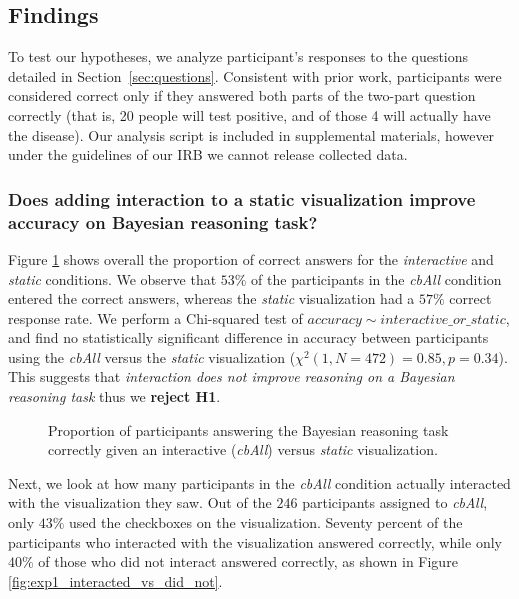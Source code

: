 \subsection{Findings}
To test our hypotheses, we analyze participant's responses to the questions detailed in Section~\ref{sec:questions}. Consistent with prior work\cite{ottley2016Bayesian, ottley2019Curious}, participants were considered correct only if they answered both parts of the two-part question correctly (that is, 20 people will test positive, and of those 4 will actually have the disease). Our analysis script is included in supplemental materials, however under the guidelines of our IRB we cannot release collected data.

\subsubsection{Does adding interaction to a static visualization improve accuracy on Bayesian reasoning task?}
\label{sec:exp1_analysis}

Figure \ref{fig:exp1_static_vs_int} shows overall the proportion of correct answers for the \textit{interactive} and \textit{static} conditions. We observe that $53\%$ of the participants in the \textit{cbAll} condition entered the correct answers, whereas the \textit{static} visualization had a $57\%$ correct response rate.
We perform a Chi-squared test of $accuracy \sim interactive\_or\_static$, and find no statistically significant difference in accuracy between participants using the \textit{cbAll} versus the \textit{static} visualization ($\chi^2(1, N = 472) = 0.85, p = 0.34$). This suggests that \textit{interaction does not improve reasoning on a Bayesian reasoning task} thus we \textbf{reject H1}.    

\begin{figure}[h!]
    \centering
    \caption{Proportion of participants answering the Bayesian reasoning task correctly given an interactive (\textit{cbAll}) versus \textit{static} visualization.}
    \label{fig:exp1_static_vs_int}
\end{figure}

Next, we look at how many participants in the \textit{cbAll} condition actually interacted with the visualization they saw. Out of the $246$ participants assigned to \textit{cbAll}, only $43\%$ used the checkboxes on the visualization. Seventy percent of the participants who interacted with the visualization answered correctly, while only $40\%$ of those who did not interact answered correctly, as shown in Figure \ref{fig:exp1_interacted_vs_did_not}.

